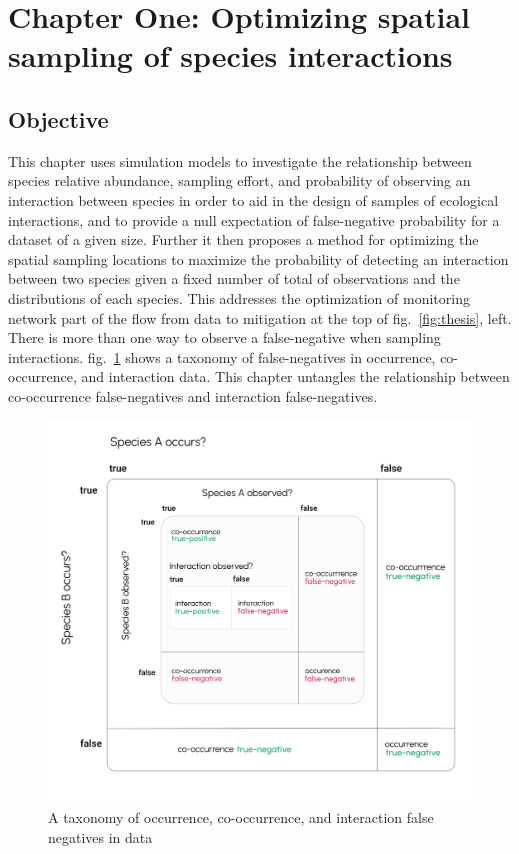 \documentclass[10pt,oneside]{article}
\makeatletter
\def\maxwidth{\ifdim\Gin@nat@width>\linewidth\linewidth
\else\Gin@nat@width\fi}
\let\Oldincludegraphics\includegraphics
\renewcommand{\includegraphics}[1]{\Oldincludegraphics[width=\maxwidth]{#1}}
\makeatother
\begin{document}
\hypertarget{chapter-one-optimizing-spatial-sampling-of-species-interactions}{%
\section{Chapter One: Optimizing spatial sampling of species
interactions}\label{chapter-one-optimizing-spatial-sampling-of-species-interactions}}

\hypertarget{objective}{%
\subsection{Objective}\label{objective}}

This chapter uses simulation models to investigate the relationship
between species relative abundance, sampling effort, and probability of
observing an interaction between species in order to aid in the design
of samples of ecological interactions, and to provide a null expectation
of false-negative probability for a dataset of a given size. Further it
then proposes a method for optimizing the spatial sampling locations to
maximize the probability of detecting an interaction between two species
given a fixed number of total of observations and the distributions of
each species. This addresses the optimization of monitoring network part
of the flow from data to mitigation at the top of fig.~\ref{fig:thesis},
left. There is more than one way to observe a false-negative when
sampling interactions. fig.~\ref{fig:fnrtaxonomy} shows a taxonomy of
false-negatives in occurrence, co-occurrence, and interaction data. This
chapter untangles the relationship between co-occurrence false-negatives
and interaction false-negatives.

\begin{figure}
\hypertarget{fig:fnrtaxonomy}{%
\centering
\includegraphics{./figures/ch2.png}
\caption{A taxonomy of occurrence, co-occurrence, and interaction false
negatives in data}\label{fig:fnrtaxonomy}
}
\end{figure}
\end{document}
